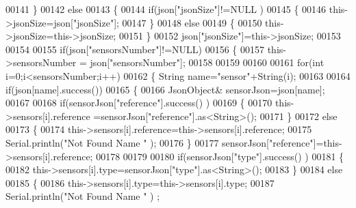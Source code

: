 \begin{DoxyCode}
00141         \} 
00142         \textcolor{keywordflow}{else}
00143         \{   
00144             \textcolor{keywordflow}{if}(json[\textcolor{stringliteral}{"jsonSize"}]!=NULL )
00145             \{           
00146                 this->jsonSize=json[\textcolor{stringliteral}{"jsonSize"}];
00147             \}
00148             \textcolor{keywordflow}{else}
00149             \{
00150                 this->jsonSize=this->jsonSize;
00151             \}
00152             json[\textcolor{stringliteral}{"jsonSize"}]=this->jsonSize;            
00153 
00154             
00155             \textcolor{keywordflow}{if}(json[\textcolor{stringliteral}{"sensorsNumber"}]!=NULL)
00156             \{
00157                 this->sensorsNumber = json[\textcolor{stringliteral}{"sensorsNumber"}];
00158                 
00159                 
00160 
00161                 \textcolor{keywordflow}{for}(\textcolor{keywordtype}{int} i=0;i<sensorsNumber;i++)
00162                 \{   String name=\textcolor{stringliteral}{"sensor"}+String(i);
00163                     
00164                     \textcolor{keywordflow}{if}(json[name].success())
00165                     \{  
00166                         JsonObject& sensorJson=json[name];
00167                         
00168                         \textcolor{keywordflow}{if}(sensorJson[\textcolor{stringliteral}{"reference"}].success() )
00169                         \{  
00170                             this->sensors[i].reference =sensorJson[\textcolor{stringliteral}{"reference"}].as<String>();
00171                         \}
00172                         \textcolor{keywordflow}{else}
00173                         \{
00174                             this->sensors[i].reference=this->sensors[i].reference;                          
00175                             Serial.println(\textcolor{stringliteral}{"Not Found Name "} );     
00176                         \}
00177                         sensorJson[\textcolor{stringliteral}{"reference"}]=this->sensors[i].reference;
00178 
00179                     
00180                         \textcolor{keywordflow}{if}(sensorJson[\textcolor{stringliteral}{"type"}].success() )
00181                         \{                   
00182                             this->sensors[i].type=sensorJson[\textcolor{stringliteral}{"type"}].as<String>();
00183                         \}
00184                         \textcolor{keywordflow}{else}
00185                         \{
00186                             this->sensors[i].type=this->sensors[i].type;
00187                             Serial.println(\textcolor{stringliteral}{"Not Found Name "} ) ;                        

\end{DoxyCode}
